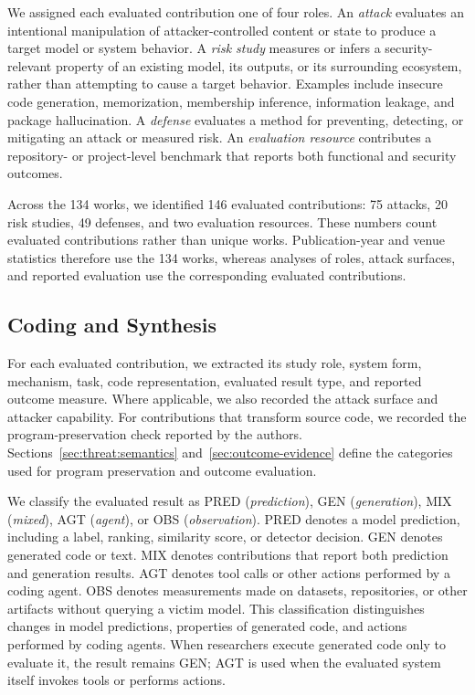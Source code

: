 \documentclass[acmsmall,screen,review]{acmart}
\begin{document}
We assigned each evaluated contribution one of four roles. An \emph{attack} evaluates an intentional manipulation of attacker-controlled content or state to produce a target model or system behavior. A \emph{risk study} measures or infers a security-relevant property of an existing model, its outputs, or its surrounding ecosystem, rather than attempting to cause a target behavior. Examples include insecure code generation, memorization, membership inference, information leakage, and package hallucination. A \emph{defense} evaluates a method for preventing, detecting, or mitigating an attack or measured risk. An \emph{evaluation resource} contributes a repository- or project-level benchmark that reports both functional and security outcomes.

Across the 134 works, we identified 146 evaluated contributions: 75 attacks, 20 risk studies, 49 defenses, and two evaluation resources. These numbers count evaluated contributions rather than unique works. Publication-year and venue statistics therefore use the 134 works, whereas analyses of roles, attack surfaces, and reported evaluation use the corresponding evaluated contributions.



\subsection{Coding and Synthesis}
\label{sec:coding}

For each evaluated contribution, we extracted its study role, system form, mechanism, task, code representation, evaluated result type, and reported outcome measure. Where applicable, we also recorded the attack surface and attacker capability. For contributions that transform source code, we recorded the program-preservation check reported by the authors. Sections~\ref{sec:threat:semantics} and~\ref{sec:outcome-evidence} define the categories used for program preservation and outcome evaluation.

We classify the evaluated result as \textsf{PRED} (\emph{prediction}), \textsf{GEN} (\emph{generation}), \textsf{MIX} (\emph{mixed}), \textsf{AGT} (\emph{agent}), or \textsf{OBS} (\emph{observation}). \textsf{PRED} denotes a model prediction, including a label, ranking, similarity score, or detector decision. \textsf{GEN} denotes generated code or text. \textsf{MIX} denotes contributions that report both prediction and generation results. \textsf{AGT} denotes tool calls or other actions performed by a coding agent. \textsf{OBS} denotes measurements made on datasets, repositories, or other artifacts without querying a victim model. This classification distinguishes changes in model predictions, properties of generated code, and actions performed by coding agents. When researchers execute generated code only to evaluate it, the result remains \textsf{GEN}; \textsf{AGT} is used when the evaluated system itself invokes tools or performs actions.
\end{document}
